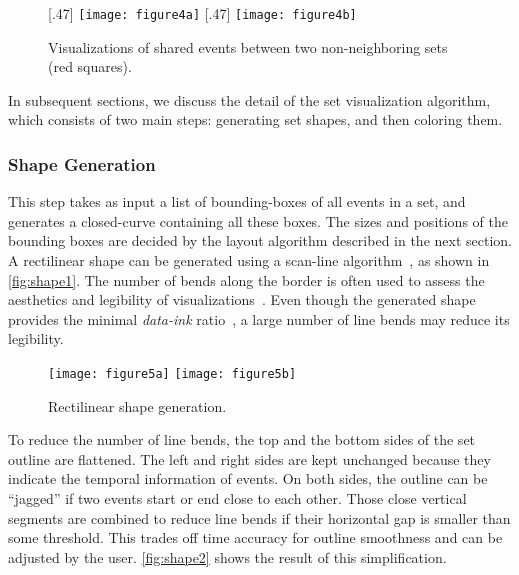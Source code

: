 \begin{figure}[!htb]
	\centering
	[.47\columnwidth]
	{\texttt{[image: figure4a]}}
	\hfill
	[.47\columnwidth]
	{\texttt{[image: figure4b]}}
	\caption{Visualizations of shared events between two non-neighboring sets (red squares).}
	\label{fig:layering-compare}
\end{figure}

In subsequent sections, we discuss the detail of the set visualization algorithm, which consists of two main steps: generating set shapes, and then coloring them.

\subsubsection{Shape Generation}
\label{sub:shapesgeneration}
This step takes as input a list of bounding-boxes of all events in a set, and generates a closed-curve containing all these boxes. The sizes and positions of the bounding boxes are decided by the layout algorithm described in the next section. A rectilinear shape can be generated using a scan-line algorithm~\cite{Foley1997}, as shown in \autoref{fig:shape1}. The number of bends along the border is often used to assess the aesthetics and legibility of visualizations~\cite{Tanahashi2012}. Even though the generated shape provides the minimal \textit{data-ink} ratio~\cite{Tufte1983}, a large number of line bends may reduce its legibility.

\begin{figure}[!htb]
	\centering
	{\texttt{[image: figure5a]}}
	\hfill
	{\texttt{[image: figure5b]}}
	\caption{Rectilinear shape generation.}
	\label{fig:shape}
\end{figure}

To reduce the number of line bends, the top and the bottom sides of the set outline are flattened. The left and right sides  are kept unchanged because they indicate the temporal information of events. On both sides, the outline can be ``jagged'' if two events start or end close to each other. Those close vertical segments are combined to reduce line bends if their horizontal gap is smaller than some threshold. This trades off time accuracy for outline smoothness and can be adjusted by the user. \autoref{fig:shape2} shows the result of this simplification.

